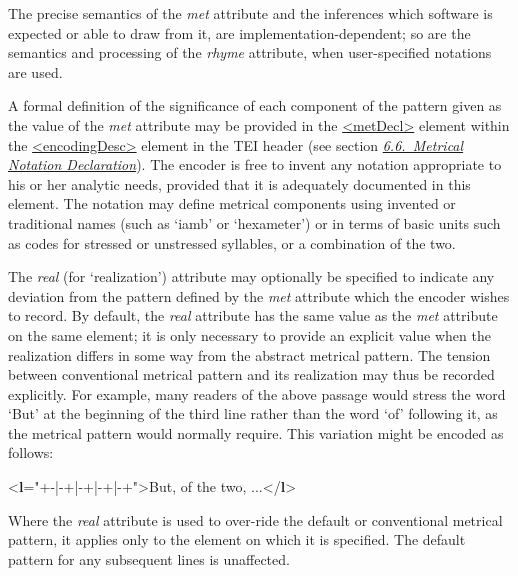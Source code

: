 The precise semantics of the {\itshape met} attribute and the inferences which software is expected or able to draw from it, are implementation-dependent; so are the semantics and processing of the {\itshape rhyme} attribute, when user-specified notations are used.\par
A formal definition of the significance of each component of the pattern given as the value of the {\itshape met} attribute may be provided in the \hyperref[TEI.metDecl]{<metDecl>} element within the \hyperref[TEI.encodingDesc]{<encodingDesc>} element in the TEI header (see section \textit{\hyperref[HDMN]{6.6.\ Metrical Notation Declaration}}). The encoder is free to invent any notation appropriate to his or her analytic needs, provided that it is adequately documented in this element. The notation may define metrical components using invented or traditional names (such as ‘iamb’ or ‘hexameter’) or in terms of basic units such as codes for stressed or unstressed syllables, or a combination of the two.\par
The {\itshape real} (for ‘realization’) attribute may optionally be specified to indicate any deviation from the pattern defined by the {\itshape met} attribute which the encoder wishes to record. By default, the {\itshape real} attribute has the same value as the {\itshape met} attribute on the same element; it is only necessary to provide an explicit value when the realization differs in some way from the abstract metrical pattern. The tension between conventional metrical pattern and its realization may thus be recorded explicitly. For example, many readers of the above passage would stress the word ‘But’ at the beginning of the third line rather than the word ‘of’ following it, as the metrical pattern would normally require. This variation might be encoded as follows: \par\bgroup{}\exampleFont \begin{shaded}\noindent\mbox{}{<\textbf{l}\hspace*{1em}{real}="{+-|-+|-+|-+|-+}">}But, of the two, ...{</\textbf{l}>}\end{shaded}\egroup\par \par
Where the {\itshape real} attribute is used to over-ride the default or conventional metrical pattern, it applies only to the element on which it is specified. The default pattern for any subsequent lines is unaffected.\par
